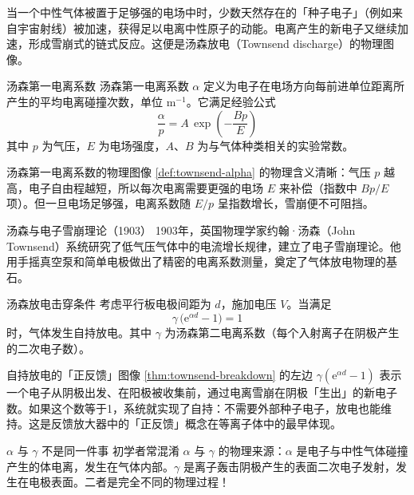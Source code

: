 \documentclass[12pt,a4paper,openany,oneside]{book}
\newcommand{\ee}{\mathrm{e}}
\begin{document}
当一个中性气体被置于足够强的电场中时，少数天然存在的「种子电子」（例如来自宇宙射线）被加速，获得足以电离中性原子的动能。电离产生的新电子又继续加速，形成雪崩式的链式反应。这便是汤森放电（Townsend discharge）的物理图像。

\begin{definition}{汤森第一电离系数}{}{}
\label{def:townsend-alpha}
汤森第一电离系数 $\alpha$ 定义为电子在电场方向每前进单位距离所产生的平均电离碰撞次数，单位 $\mathrm{m^{-1}}$。它满足经验公式
\begin{equation}
\label{eq:townsend-alpha}
\frac{\alpha}{p} = A \,\exp\!\left(-\frac{Bp}{E}\right)
\end{equation}
其中 $p$ 为气压，$E$ 为电场强度，$A$、$B$ 为与气体种类相关的实验常数。
\end{definition}

\begin{insight}{汤森第一电离系数的物理图像}{}
\cref{def:townsend-alpha} 的物理含义清晰：气压 $p$ 越高，电子自由程越短，所以每次电离需要更强的电场 $E$ 来补偿（指数中 $Bp/E$ 项）。但一旦电场足够强，电离系数随 $E/p$ 呈指数增长，雪崩便不可阻挡。
\end{insight}

\begin{history}{汤森与电子雪崩理论（1903）}{}
1903年，英国物理学家约翰·汤森（John Townsend）系统研究了低气压气体中的电流增长规律，建立了电子雪崩理论。他用手摇真空泵和简单电极做出了精密的电离系数测量，奠定了气体放电物理的基石。
\end{history}

\begin{theorem}{汤森放电击穿条件}{}{}
\label{thm:townsend-breakdown}
考虑平行板电极间距为 $d$，施加电压 $V$。当满足
\begin{equation}
\label{eq:townsend-breakdown}
\gamma \,\bigl(\ee^{\alpha d} - 1\bigr) = 1
\end{equation}
时，气体发生自持放电。其中 $\gamma$ 为汤森第二电离系数（每个入射离子在阴极产生的二次电子数）。
\end{theorem}

\begin{insight}{自持放电的「正反馈」图像}{}
\cref{thm:townsend-breakdown} 的左边 $\gamma(\ee^{\alpha d}-1)$ 表示一个电子从阴极出发、在阳极被收集前，通过电离雪崩在阴极「生出」的新电子数。如果这个数等于1，系统就实现了自持：不需要外部种子电子，放电也能维持。这是反馈放大器中的「正反馈」概念在等离子体中的最早体现。
\end{insight}

\begin{warning}{$\alpha$ 与 $\gamma$ 不是同一件事}{}
初学者常混淆 $\alpha$ 与 $\gamma$ 的物理来源：$\alpha$ 是电子与中性气体碰撞产生的体电离，发生在气体内部。$\gamma$ 是离子轰击阴极产生的表面二次电子发射，发生在电极表面。二者是完全不同的物理过程！
\end{warning}
\end{document}
